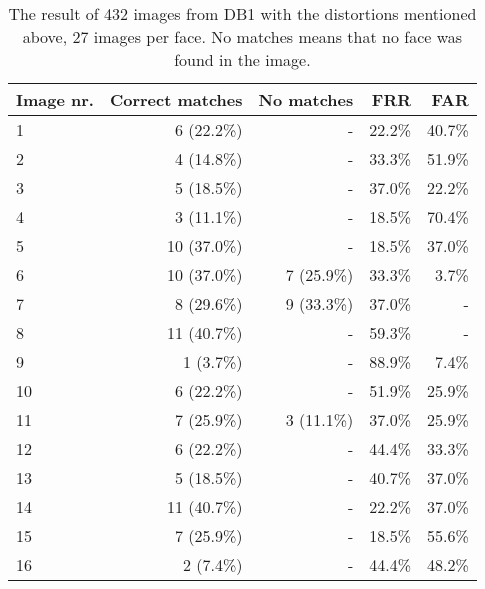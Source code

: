 \begin{table}
    \caption{The result of 432 images from DB1 with the distortions mentioned above, 27 images per face. No matches means that no face was found in the image.}
    \begin{tabular}{|l|r|r|r|r|}
    \hline
    \textbf{Image nr.}   & \textbf{Correct matches}   & \textbf{No matches}       & \textbf{FRR}    & \textbf{FAR}       \\ \hline
    1           & 6 (22.2\%)        & -                & 22.2\% & 40.7\%    \\ \hline
    2           & 4 (14.8\%)        & -                & 33.3\% & 51.9\%    \\ \hline
    3           & 5 (18.5\%)        & -                & 37.0\% & 22.2\%    \\ \hline
    4           & 3 (11.1\%)        & -                & 18.5\% & 70.4\%    \\ \hline
    5           & 10 (37.0\%)       & -                & 18.5\% & 37.0\%    \\ \hline
    6           & 10 (37.0\%)       & 7 (25.9\%)       & 33.3\% & 3.7\%     \\ \hline
    7           & 8 (29.6\%)        & 9 (33.3\%)       & 37.0\% & -         \\ \hline
    8           & 11 (40.7\%)       & -                & 59.3\% & -         \\ \hline
    9           & 1 (3.7\%)         & -                & 88.9\% & 7.4\%     \\ \hline
    10          & 6 (22.2\%)        & -                & 51.9\% & 25.9\%    \\ \hline
    11          & 7 (25.9\%)        & 3 (11.1\%)       & 37.0\% & 25.9\%    \\ \hline
    12          & 6 (22.2\%)        & -                & 44.4\% & 33.3\%    \\ \hline
    13          & 5 (18.5\%)        & -                & 40.7\% & 37.0\%    \\ \hline
    14          & 11 (40.7\%)       & -                & 22.2\% & 37.0\%    \\ \hline
    15          & 7 (25.9\%)        & -                & 18.5\% & 55.6\%    \\ \hline
    16          & 2 (7.4\%)         & -                & 44.4\% & 48.2\%    \\
    \hline
    \end{tabular}
    \label{tbl:breakdown}
\end{table}
